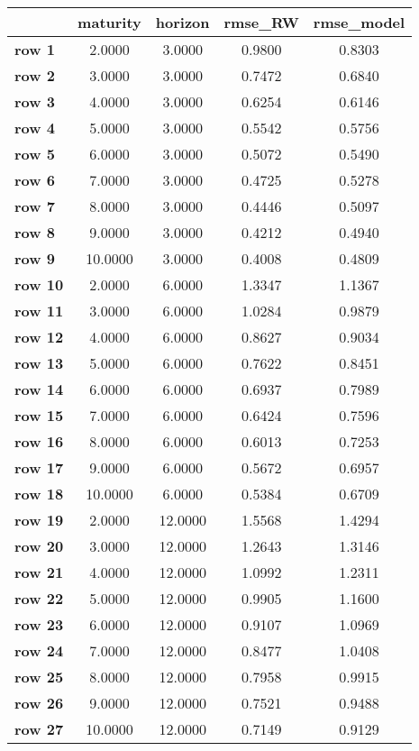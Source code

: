 \begin{tiny}\begin{tabular}{|l|c|c|c|c|}
\hline
&\textbf{maturity}&\textbf{horizon}&\textbf{rmse_RW}&\textbf{rmse_model}\\\hline
\textbf{row 1}&2.0000&3.0000&0.9800&0.8303\\\hline
\textbf{row 2}&3.0000&3.0000&0.7472&0.6840\\\hline
\textbf{row 3}&4.0000&3.0000&0.6254&0.6146\\\hline
\textbf{row 4}&5.0000&3.0000&0.5542&0.5756\\\hline
\textbf{row 5}&6.0000&3.0000&0.5072&0.5490\\\hline
\textbf{row 6}&7.0000&3.0000&0.4725&0.5278\\\hline
\textbf{row 7}&8.0000&3.0000&0.4446&0.5097\\\hline
\textbf{row 8}&9.0000&3.0000&0.4212&0.4940\\\hline
\textbf{row 9}&10.0000&3.0000&0.4008&0.4809\\\hline
\textbf{row 10}&2.0000&6.0000&1.3347&1.1367\\\hline
\textbf{row 11}&3.0000&6.0000&1.0284&0.9879\\\hline
\textbf{row 12}&4.0000&6.0000&0.8627&0.9034\\\hline
\textbf{row 13}&5.0000&6.0000&0.7622&0.8451\\\hline
\textbf{row 14}&6.0000&6.0000&0.6937&0.7989\\\hline
\textbf{row 15}&7.0000&6.0000&0.6424&0.7596\\\hline
\textbf{row 16}&8.0000&6.0000&0.6013&0.7253\\\hline
\textbf{row 17}&9.0000&6.0000&0.5672&0.6957\\\hline
\textbf{row 18}&10.0000&6.0000&0.5384&0.6709\\\hline
\textbf{row 19}&2.0000&12.0000&1.5568&1.4294\\\hline
\textbf{row 20}&3.0000&12.0000&1.2643&1.3146\\\hline
\textbf{row 21}&4.0000&12.0000&1.0992&1.2311\\\hline
\textbf{row 22}&5.0000&12.0000&0.9905&1.1600\\\hline
\textbf{row 23}&6.0000&12.0000&0.9107&1.0969\\\hline
\textbf{row 24}&7.0000&12.0000&0.8477&1.0408\\\hline
\textbf{row 25}&8.0000&12.0000&0.7958&0.9915\\\hline
\textbf{row 26}&9.0000&12.0000&0.7521&0.9488\\\hline
\textbf{row 27}&10.0000&12.0000&0.7149&0.9129\\\hline
\end{tabular}
\end{tiny}